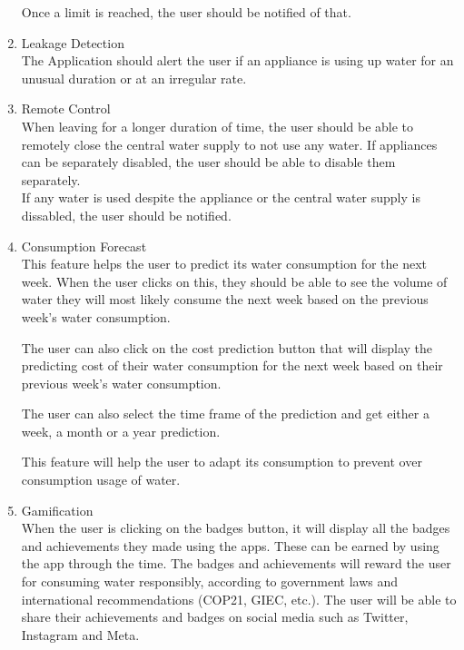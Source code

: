 \documentclass[10pt]{article}
\begin{document}
\begin{enumerate}
  Once a limit is reached, the user should be notified of that.


  \item {Leakage Detection} \\
  The Application should alert the user if an appliance is using up water for an unusual duration or at an irregular rate.
  
  \item {Remote Control} \\
  When leaving for a longer duration of time, the user should be able to remotely close the central water supply to not use any water. If appliances can be separately disabled, the user should be able to disable them separately. \\
  If any water is used despite the appliance or the central water supply is dissabled, the user should be notified.

  \item {Consumption Forecast} \\
  This feature helps the user to predict its water consumption for the next week. When the user clicks on this, they should be able to see the volume of water they will most likely consume the next week based on the previous week's water consumption.

  The user can also click on the cost prediction button that will display the predicting cost of their water consumption for the next week based on their previous week's water consumption.

  The user can also select the time frame of the prediction and get either a week, a month or a year prediction.

  This feature will help the user to adapt its consumption to prevent over consumption usage of water.

  \item {Gamification} \\
  When the user is clicking on the badges button, it will display all the badges and achievements they made using the apps. These can be earned by using the app through the time. The badges and achievements will reward the user for consuming water responsibly, according to government laws and international recommendations (COP21, GIEC, etc.). The user will be able to share their achievements and badges on social media such as Twitter, Instagram and Meta.

\end{enumerate}
\end{document}
